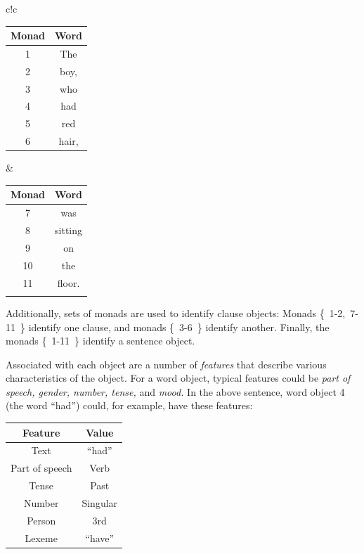 \documentclass[11pt,oneside,a4paper]{memoir}
\begin{document}
\begin{center}
  \begin{tabular}{c!{\hspace{1cm}}c}

    \begin{tabular}{cc}
      \toprule
      \textbf{Monad} & \textbf{Word}\\
      \midrule
      1 & The  \\
      2 & boy, \\
      3 & who  \\
      4 & had  \\
      5 & red  \\
      6 & hair,\\
      \bottomrule
    \end{tabular}

    &

    \begin{tabular}{cc}
      \toprule
      \textbf{Monad} & \textbf{Word}\\
      \midrule
      7 & was\\
      8 & sitting\\
      9 & on\\
      10 & the\\
      11 & floor.\\
      &  \\
      \bottomrule
    \end{tabular}

  \end{tabular}
\end{center}




Additionally, sets of monads are used to identify clause objects: Monads \{~1-2,~7-11~\} identify
one clause, and monads \{~3-6~\} identify another. Finally, the monads \{~1-11~\} identify a
sentence object.

Associated with each object are a number of \emph{features} that describe various characteristics of the
object. For a word object, typical features could be \emph{part of speech, gender, number, tense,} and
\emph{mood.} In the above sentence, word object 4 (the word ``had'') could, for example, have these features:

\begin{center}
\begin{tabular}{cc}
\textbf{Feature} & \textbf{Value}\\
\hline
Text           & ``had''\\
Part of speech & Verb\\
Tense          & Past\\
Number         & Singular\\
Person         & 3rd\\
Lexeme         & ``have''
\end{tabular}
\end{center}
\end{document}
